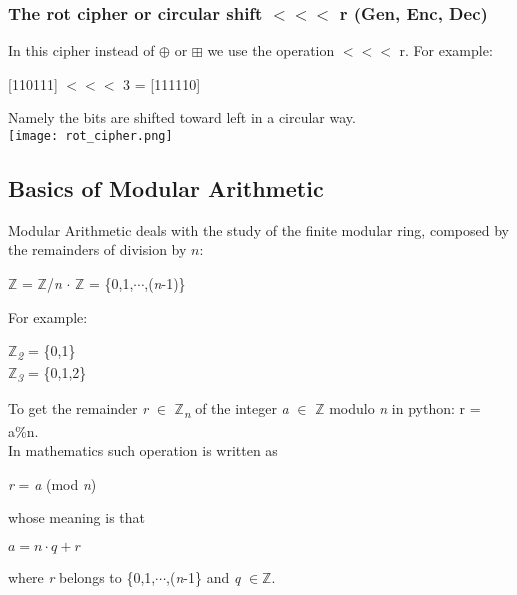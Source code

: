 \documentclass{article}
\begin{document}
\subsubsection{The rot cipher or circular shift $<<<$ r (Gen, Enc, Dec)}
In this cipher instead of $\oplus$ or $\boxplus$ we use the operation $<<<$ r.  For example:\\
\begin{center}
[110111] $<<<$ 3 = [111110]
\end{center}
Namely the bits are shifted toward left in a circular way.\\

\texttt{[image: rot\_cipher.png]}

\subsection{Basics of Modular Arithmetic}
Modular Arithmetic deals with the study of the finite modular ring, composed by the remainders of division by $n$:\\
\begin{center}
$\mathbb{Z}$ = $\mathbb{Z}$/\textit{n} $\cdot$  $ \mathbb{Z}$  = \{0,1,$\cdots$,(\textit{n}-1)\}
\end{center}

For example:\\
\begin{center}
$\mathbb{Z}$\textsubscript{\textit{2}} = \{0,1\} \\
$\mathbb{Z}$\textsubscript{\textit{3}} = \{0,1,2\} \\
\end{center}

To get the remainder \textit{r} $\in$ $\mathbb{Z}$\textsubscript{\textit{n}} of the integer \textit{a} $\in$ $\mathbb{Z}$ modulo \textit{n} in python: r = a\%n.\\
In mathematics such operation is written as\\

\begin{center}
\textit{r} = \textit{a} (mod \textit{n})
\end{center}

whose meaning is that\\

\begin{center}
$a = n \cdot q + r$
\end{center}

where \textit{r} belongs to \{0,1,$\cdots$,(\textit{n}-1\} and \textit{q} $\in \mathbb{Z}$.
\end{document}

